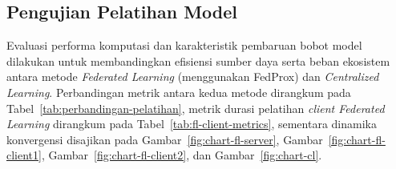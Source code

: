 \documentclass[conference]{IEEEtran}
\begin{document}
\subsection{Pengujian Pelatihan Model}
Evaluasi performa komputasi dan karakteristik pembaruan bobot model dilakukan untuk membandingkan efisiensi sumber daya serta beban ekosistem antara metode \textit{Federated Learning} (menggunakan FedProx) dan \textit{Centralized Learning}. Perbandingan metrik antara kedua metode dirangkum pada Tabel~\ref{tab:perbandingan-pelatihan}, metrik durasi pelatihan \textit{client Federated Learning} dirangkum pada Tabel~\ref{tab:fl-client-metrics}, sementara dinamika konvergensi disajikan pada Gambar~\ref{fig:chart-fl-server}, Gambar~\ref{fig:chart-fl-client1}, Gambar~\ref{fig:chart-fl-client2}, dan Gambar~\ref{fig:chart-cl}.
\end{document}

